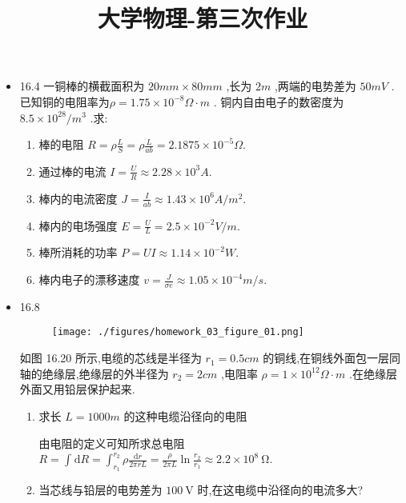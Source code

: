 
\usepackage{../../homeworks_preamble}

\title{大学物理-第三次作业}


    \maketitle
    \begin{itemize}
        \item 16.4 一铜棒的横截面积为 $20mm\times 80mm$ ,长为 $2m$ ,两端的电势差为 $50mV$ .已知铜的电阻率为$\rho=1.75\times 10^{-8}\Omega \cdot m$ . 铜内自由电子的数密度为 $8.5 \times 10^{28} /m^{3}$ .求:
            \begin{enumerate}
                \item 棒的电阻
                    $R=\rho \frac{L}{S}=\rho \frac{L}{ab}=2.1875\times 10^{-5}\Omega$.
                \item 通过棒的电流 $I=\frac{U}{R}\approx 2.28\times 10^{3}A$.
                \item 棒内的电流密度 $J=\frac{I}{ab}\approx 1.43\times 10^{6} A / m^2$.
                \item 棒内的电场强度 $E=\frac{U}{L}=2.5\times 10^{-2}V / m$.
                \item 棒所消耗的功率 $P=UI\approx 1.14\times 10^{-2}W$.
                \item 棒内电子的漂移速度 $v=\frac{J}{\sigma e}\approx 1.05\times 10^{-4}m /s$.
            \end{enumerate}
        \item 16.8 
            \begin{figure}[htbp]
                \texttt{[image: ./figures/homework\_03\_figure\_01.png]}
            \end{figure}

            如图 16.20 所示,电缆的芯线是半径为 $r_1=0.5cm$ 的铜线,在铜线外面包一层同轴的绝缘层,绝缘层的外半径为 $r_2=2 cm$ ,电阻率 $\rho=1\times 10^{12}\Omega \cdot m$ .在绝缘层外面又用铅层保护起来.
            \begin{enumerate}
                \item 求长 $L=1000m$ 的这种电缆沿径向的电阻

                    由电阻的定义可知所求总电阻 $R=\int_{}^{} \mathrm{d} R=\int_{r_1}^{r_2}\rho \frac{\mathrm{d}r}{2\pi r L}=\frac{\rho}{2\pi L}\ln \frac{r_2}{r_1}\approx 2.2\times 10^{8}\ \mathrm{\Omega}$.
                \item 当芯线与铅层的电势差为 $100\ \mathrm{V}$ 时,在这电缆中沿径向的电流多大?


\end{enumerate}
\end{itemize}

